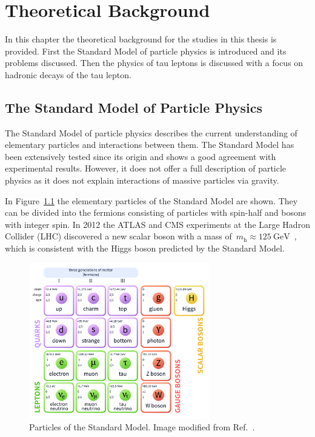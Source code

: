 \chapter{Theoretical Background}
\label{sec:theory}

In this chapter the theoretical background for the studies in this thesis is
provided. First the Standard Model of particle physics is introduced and its
problems discussed. Then the physics of tau leptons is discussed with a focus on
hadronic decays of the tau lepton.

\section{The Standard Model of Particle Physics}

The Standard Model of particle physics describes the current understanding of
elementary particles and interactions between them. The Standard Model has been
extensively tested since its origin and shows a good agreement with experimental
results. However, it does not offer a full description of particle physics as it
does not explain interactions of massive particles via gravity.

In Figure~\ref{fig:sm_particles} the elementary particles of the Standard Model
are shown. They can be divided into the fermions consisting of particles with
spin-half and bosons with integer spin. In 2012 the ATLAS and CMS experiments at
the Large Hadron Collider (LHC) discovered a new scalar boson with a mass
of~$m_\text{h} \approx \SI{125}{\GeV}$~\cite{higgs_atlas, higgs_cms}, which is
consistent with the Higgs boson predicted by the Standard Model.

\begin{figure}[htb]
  \centering
  \includegraphics[width=0.7\textwidth]{./figures/theory/sm_particles.pdf}
  \caption{Particles of the Standard Model. Image modified from
    Ref.~\cite{sm_wiki}.}
  \label{fig:sm_particles}
\end{figure}

